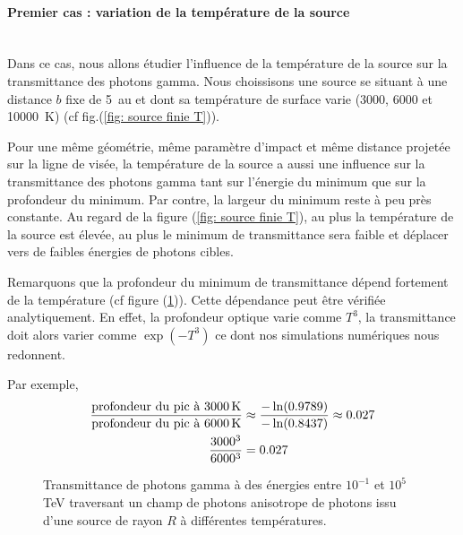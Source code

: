 \documentclass[a4paper,12pt,twoside]{article}
\begin{document}
\paragraph*{Premier cas : variation de la température de la source}\hspace{0pt} \\
Dans ce cas, nous allons étudier l'influence de la température de la source sur la transmittance des photons gamma. Nous choissisons une source se situant à une distance $b$ fixe de \SI{5}{\astronomicalunit} et dont sa température de surface varie (3000, 6000 et \SI{10000}{\K}) (cf fig.(\ref{fig: source finie T})).

Pour une même géométrie, même paramètre d'impact et même distance projetée sur la ligne de visée, la température de la source a aussi une influence sur la transmittance des photons gamma tant sur l'énergie du minimum que sur la profondeur du minimum. Par contre, la largeur du minimum reste à peu près constante. Au regard de la figure (\ref{fig: source finie T}), au plus la température de la source est élevée, au plus le minimum de transmittance sera faible et déplacer vers de faibles énergies de photons cibles.

Remarquons que la profondeur du minimum de transmittance dépend fortement de la température (cf figure (\ref{fig: Transmittance})). Cette dépendance peut être vérifiée analytiquement. En effet, la profondeur optique varie comme $T^3$, la transmittance doit alors varier comme $\exp (-T^3)$ ce dont nos simulations numériques nous redonnent.

Par exemple,
\begin{align*}
	\frac{\text{profondeur du pic à \SI{3000}{\K}}}{\text{profondeur du pic à \SI{6000}{\K}}} &\approx \frac{- \ln (0.9789)}{- \ln(0.8437)} \approx 0.027\\
    \frac{3000^3}{6000^3} &= 0.027
\end{align*}

\begin{figure}[H]
	\centering
    \hfill
    \hfill
    \hfill
    \caption{Transmittance de photons gamma à des énergies entre $10^{-1}$ et $10^5$ \si{\TeV} traversant un champ de photons anisotrope de photons issu d'une source de rayon $R$ à différentes températures.}
    \label{fig: Transmittance}
\end{figure}
\newpage
\end{document}
